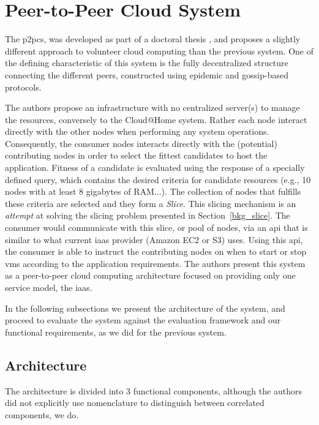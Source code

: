 \documentclass[12pt, titlepage]{uo_temp}
\begin{document}
     \section{Peer-to-Peer Cloud System}
     The \gls{p2pcs}, was developed as part of a doctoral thesis \cite{P2PCS}, and
     proposes a slightly different approach to volunteer cloud computing than the previous
     system. One of the defining characteristic of this system is the fully decentralized
     structure connecting the different peers, constructed using epidemic and gossip-based
     protocols.

     The authors propose an infrastructure with no centralized server(s) to manage the
     resources, conversely to the Cloud@Home system. Rather each node interact directly
     with the other nodes when performing any system operations. Consequently, the
     consumer nodes interacts directly with the (potential) contributing nodes in order to
     select the fittest candidates to host the application. Fitness of a candidate is
     evaluated using the response of a specially defined query, which contains the desired
     criteria for candidate resources (e.g., 10 nodes with at least 8 gigabytes of
     RAM...). The collection of nodes that fulfills these criteria are selected and they
     form a \emph{Slice}. This slicing mechanism is an \emph{attempt} at solving the
     slicing problem presented in Section~\ref{bkg_slice}. The consumer would communicate
     with this slice, or pool of nodes, via an \gls{api} that is similar to what current
     \gls{iaas} provider (Amazon EC2 or S3) uses. Using this \gls{api}, the consumer is
     able to instruct the contributing nodes on when to start or stop \gls{vm}s according
     to the application requirements. The authors present this system as a peer-to-peer
     cloud computing architecture focused on providing only one service model, the
     \gls{iaas}.

     In the following subsections we present the architecture of the system, and proceed
     to evaluate the system against the evaluation framework and our functional
     requirements, as we did for the previous system.

     \subsection{Architecture}
     The architecture is divided into 3 functional components, although the authors did
     not explicitly use nomenclature to distinguish between correlated components, we do.
\end{document}
